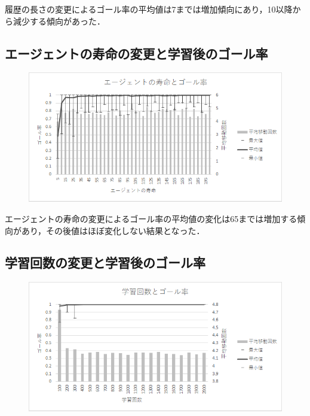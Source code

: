 \documentclass[a4j,11pt]{jarticle}
\begin{document}
履歴の長さの変更によるゴール率の平均値は7までは増加傾向にあり，10以降から減少する傾向があった．

\subsection{エージェントの寿命の変更と学習後のゴール率}

\begin{figure}[ht]
  \begin{center}
    \includegraphics[scale=1.5]{img/valAgentLifetime.png}
  \end{center}
\end{figure}

エージェントの寿命の変更によるゴール率の平均値の変化は65までは増加する傾向があり，その後値はほぼ変化しない結果となった．

\newpage

\subsection{学習回数の変更と学習後のゴール率}

\begin{figure}[ht]
  \begin{center}
    \includegraphics[scale=1.5]{img/valLearningLimit.png}
  \end{center}
\end{figure}
\end{document}
